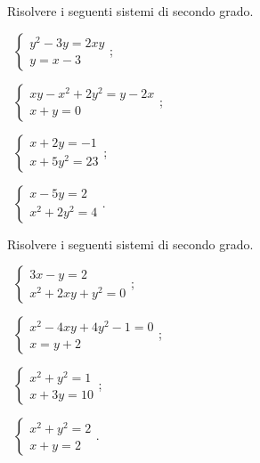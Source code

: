 \begin{esercizio}[\Ast]
\label{ese:6.2}
Risolvere i seguenti sistemi di secondo grado.
\begin{multicols}{2}
 \begin{enumeratea}
 \item~$\left\{\begin{array}{l}y^2-3y=2xy\\y=x-3\end{array}\right.$;
 \item~$\left\{\begin{array}{l}xy-x^2+2y^2=y-2x\\x+y=0\end{array}\right.$;
 \item~$\left\{\begin{array}{l}{x+2y=-1}\\{x+5y^2=23}\end{array}\right.$;
 \item~$\left\{\begin{array}{l}{x-5y=2}\\{x^2+2y^2=4}\end{array}\right.$.
 \end{enumeratea}
 \end{multicols}
\end{esercizio}

\begin{esercizio}[\Ast]
 \label{ese:6.3}
Risolvere i seguenti sistemi di secondo grado.
\begin{multicols}{2}
 \begin{enumeratea}
 \item~$\left\{\begin{array}{l}3x-y=2\\x^2+2xy+y^2=0\end{array}\right.$;
 \item~$\left\{\begin{array}{l}x^2-4xy+4y^2-1=0\\x=y+2\end{array}\right.$;
 \item~$\left\{\begin{array}{l}x^2+y^2=1\\x+3y=10\end{array}\right.$;
 \item~$\left\{\begin{array}{l}x^2+y^2=2\\x+y=2\end{array}\right.$.
 \end{enumeratea}
 \end{multicols}
\end{esercizio}

